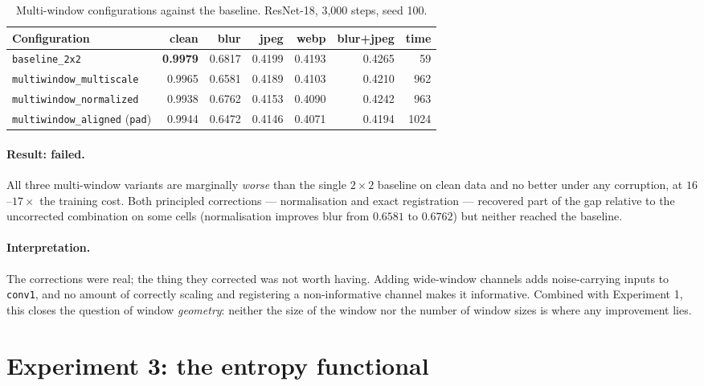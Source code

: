 \begin{table}[t]
  \centering
  \caption{Multi-window configurations against the baseline. ResNet-18,
  3{,}000 steps, seed 100.}
  \label{tab:multiwindow}
  \begin{tabular}{lrrrrrr}
    \toprule
    Configuration & clean & blur & jpeg & webp & blur+jpeg & time \\
    \midrule
    \texttt{baseline\_2x2}                      & \textbf{0.9979} & 0.6817 & 0.4199 & 0.4193 & 0.4265 & 59 \\
    \texttt{multiwindow\_multiscale}            & 0.9965 & 0.6581 & 0.4189 & 0.4103 & 0.4210 & 962 \\
    \texttt{multiwindow\_normalized}            & 0.9938 & 0.6762 & 0.4153 & 0.4090 & 0.4242 & 963 \\
    \texttt{multiwindow\_aligned} (\texttt{pad})& 0.9944 & 0.6472 & 0.4146 & 0.4071 & 0.4194 & 1024 \\
    \bottomrule
  \end{tabular}
\end{table}

\paragraph{Result: failed.} All three multi-window variants are marginally
\emph{worse} than the single $2\times2$ baseline on clean data and no better
under any corruption, at $16$--$17\times$ the training cost. Both principled
corrections --- normalisation and exact registration --- recovered part of the
gap relative to the uncorrected combination on some cells (normalisation
improves blur from $0.6581$ to $0.6762$) but neither reached the baseline.

\paragraph{Interpretation.} The corrections were real; the thing they corrected
was not worth having. Adding wide-window channels adds noise-carrying inputs to
\texttt{conv1}, and no amount of correctly scaling and registering a
non-informative channel makes it informative. Combined with Experiment 1, this
closes the question of window \emph{geometry}: neither the size of the window
nor the number of window sizes is where any improvement lies.

\section{Experiment 3: the entropy functional}
\label{sec:exp-entropy}

